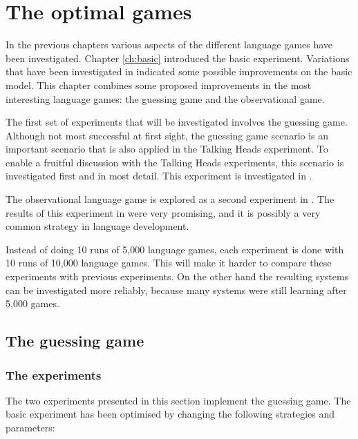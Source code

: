 \chapter{The optimal games}\label{ch:opt}

In the previous chapters various aspects of the different language games have been investigated. Chapter \ref{ch:basic} introduced the basic experiment. Variations that have been investigated in  indicated some possible improvements on the basic model. This chapter combines some proposed improvements in the most interesting language games: the guessing game and the observational game.

The first set of experiments that will be investigated involves the guessing game. Although not most successful at first sight, the guessing game scenario is an important scenario that is also applied in the Talking Heads experiment. To enable a fruitful discussion with the Talking Heads experiments, this scenario is investigated first and in most detail. This experiment is investigated in .

The observational language game is explored as a second experiment in . The results of this experiment in  were very promising, and it is possibly a very common strategy in language development.

Instead of doing 10 runs of 5,000 language games, each experiment is done with 10 runs of 10,000 language games. This will make it harder to compare these experiments with previous experiments. On the other hand the resulting systems can be investigated more reliably, because many systems were still learning after 5,000 games. 

\section{The guessing game}\label{s:opt:gg}
\subsection{The experiments}

The two experiments presented in this section implement the guessing game. The basic experiment has been optimised by changing the following strategies and parameters:

